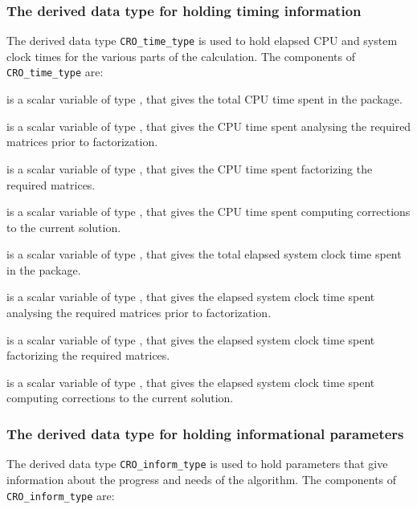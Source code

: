 \documentclass{galahad}
\newcommand{\packagename}{CRO}
\begin{document}

\subsubsection{The derived data type for holding timing
 information}\label{typetime}
The derived data type
{\tt \packagename\_time\_type}
is used to hold elapsed CPU and system clock times for the various parts of
the calculation. The components of
{\tt \packagename\_time\_type}
are:
\begin{description}
 is a scalar variable of type \realdp, that gives
 the total CPU time spent in the package.

 is a scalar variable of type \realdp, that gives
 the CPU time spent analysing the required matrices prior to factorization.

 is a scalar variable of type \realdp, that gives
 the CPU time spent factorizing the required matrices.

 is a scalar variable of type \realdp, that gives
 the CPU time spent computing corrections to the current solution.

 is a scalar variable of type \realdp, that gives
 the total elapsed system clock time spent in the package.

 is a scalar variable of type \realdp, that gives
 the elapsed system clock time spent analysing the required matrices prior to
factorization.

 is a scalar variable of type \realdp, that gives
 the elapsed system clock time spent factorizing the required matrices.

 is a scalar variable of type \realdp, that gives
 the elapsed system clock time spent computing corrections to
 the current solution.

\end{description}


\subsubsection{The derived data type for holding informational
 parameters}\label{typeinform}
The derived data type
{\tt \packagename\_inform\_type}
is used to hold parameters that give information about the progress and needs
of the algorithm. The components of
{\tt \packagename\_inform\_type}
are:
\end{document}
